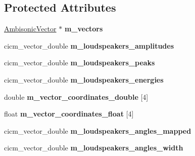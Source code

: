 \subsection*{Protected Attributes}
\begin{DoxyCompactItemize}
\item 
\hypertarget{class_ambisonics_meter_a851eee4cd189d850b028f75f44aa0fa5}{\hyperlink{class_ambisonic_vector}{Ambisonic\-Vector} $\ast$ {\bfseries m\-\_\-vectors}}\label{class_ambisonics_meter_a851eee4cd189d850b028f75f44aa0fa5}

\item 
\hypertarget{class_ambisonics_meter_aea287908ab29c57db2dd04c4b7e307d5}{cicm\-\_\-vector\-\_\-double {\bfseries m\-\_\-loudspeakers\-\_\-amplitudes}}\label{class_ambisonics_meter_aea287908ab29c57db2dd04c4b7e307d5}

\item 
\hypertarget{class_ambisonics_meter_a27343caf2b62d5e87fa99c4c1a40cd02}{cicm\-\_\-vector\-\_\-double {\bfseries m\-\_\-loudspeakers\-\_\-peaks}}\label{class_ambisonics_meter_a27343caf2b62d5e87fa99c4c1a40cd02}

\item 
\hypertarget{class_ambisonics_meter_a30e5c805ec6f9329b316d32a03969c67}{cicm\-\_\-vector\-\_\-double {\bfseries m\-\_\-loudspeakers\-\_\-energies}}\label{class_ambisonics_meter_a30e5c805ec6f9329b316d32a03969c67}

\item 
\hypertarget{class_ambisonics_meter_a703b0c4ca60b8ca98a45c15750c5229f}{double {\bfseries m\-\_\-vector\-\_\-coordinates\-\_\-double} \mbox{[}4\mbox{]}}\label{class_ambisonics_meter_a703b0c4ca60b8ca98a45c15750c5229f}

\item 
\hypertarget{class_ambisonics_meter_ac01da8c9577b0fd777a1821946f8b776}{float {\bfseries m\-\_\-vector\-\_\-coordinates\-\_\-float} \mbox{[}4\mbox{]}}\label{class_ambisonics_meter_ac01da8c9577b0fd777a1821946f8b776}

\item 
\hypertarget{class_ambisonics_meter_a82aaf6d19c3a8d7c7f1a52f65b175351}{cicm\-\_\-vector\-\_\-double {\bfseries m\-\_\-loudspeakers\-\_\-angles\-\_\-mapped}}\label{class_ambisonics_meter_a82aaf6d19c3a8d7c7f1a52f65b175351}

\item 
\hypertarget{class_ambisonics_meter_a9fa69f3a2d8bccfb6001bcf6c060b6c1}{cicm\-\_\-vector\-\_\-double {\bfseries m\-\_\-loudspeakers\-\_\-angles\-\_\-width}}\label{class_ambisonics_meter_a9fa69f3a2d8bccfb6001bcf6c060b6c1}

\end{DoxyCompactItemize}
